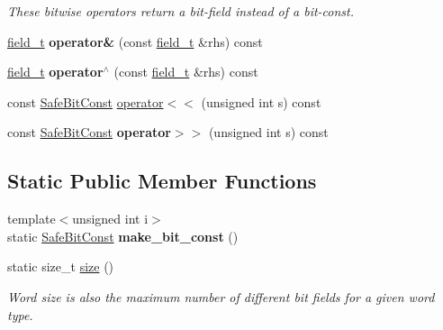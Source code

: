 \begin{DoxyCompactItemize}
\begin{DoxyCompactList}\small\item\em These bitwise operators return a bit-\/field instead of a bit-\/const. \end{DoxyCompactList}\item 
\hypertarget{classLoki_1_1SafeBitConst_a711b9919ce0086f6b4852e184f7c9907}{}\hyperlink{classLoki_1_1SafeBitConst_afc37803aa81f3704a2cef0ece9e8948c}{field\+\_\+t} {\bfseries operator\&} (const \hyperlink{classLoki_1_1SafeBitConst_afc37803aa81f3704a2cef0ece9e8948c}{field\+\_\+t} \&rhs) const \label{classLoki_1_1SafeBitConst_a711b9919ce0086f6b4852e184f7c9907}

\item 
\hypertarget{classLoki_1_1SafeBitConst_a824d4afbccf6d76f4fe148ffcf1e1a45}{}\hyperlink{classLoki_1_1SafeBitConst_afc37803aa81f3704a2cef0ece9e8948c}{field\+\_\+t} {\bfseries operator$^\wedge$} (const \hyperlink{classLoki_1_1SafeBitConst_afc37803aa81f3704a2cef0ece9e8948c}{field\+\_\+t} \&rhs) const \label{classLoki_1_1SafeBitConst_a824d4afbccf6d76f4fe148ffcf1e1a45}

\item 
const \hyperlink{classLoki_1_1SafeBitConst}{Safe\+Bit\+Const} \hyperlink{classLoki_1_1SafeBitConst_a70a37a966ba91fe89ac6f5f661f04279}{operator$<$$<$} (unsigned int s) const 
\item 
\hypertarget{classLoki_1_1SafeBitConst_a0a18cc100171be0ec8cc66b961b87cd8}{}const \hyperlink{classLoki_1_1SafeBitConst}{Safe\+Bit\+Const} {\bfseries operator$>$$>$} (unsigned int s) const \label{classLoki_1_1SafeBitConst_a0a18cc100171be0ec8cc66b961b87cd8}

\end{DoxyCompactItemize}
\subsection*{Static Public Member Functions}
\begin{DoxyCompactItemize}
\item 
\hypertarget{classLoki_1_1SafeBitConst_a8de79fe0f864bf6ce9915b50d77e88df}{}{\footnotesize template$<$unsigned int i$>$ }\\static \hyperlink{classLoki_1_1SafeBitConst}{Safe\+Bit\+Const} {\bfseries make\+\_\+bit\+\_\+const} ()\label{classLoki_1_1SafeBitConst_a8de79fe0f864bf6ce9915b50d77e88df}

\item 
\hypertarget{classLoki_1_1SafeBitConst_adca153e32459cb1bcc34b7406ec7a2fc}{}static size\+\_\+t \hyperlink{classLoki_1_1SafeBitConst_adca153e32459cb1bcc34b7406ec7a2fc}{size} ()\label{classLoki_1_1SafeBitConst_adca153e32459cb1bcc34b7406ec7a2fc}

\begin{DoxyCompactList}\small\item\em Word size is also the maximum number of different bit fields for a given word type. \end{DoxyCompactList}\end{DoxyCompactItemize}
